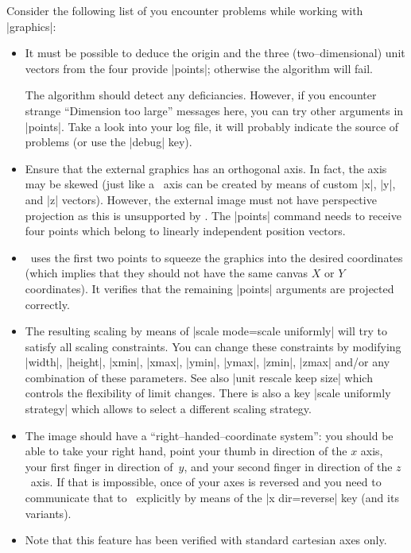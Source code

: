 {{\noindent
Consider the following list of you encounter problems while working with  |graphics|:
\begin{itemize}
	\item It must be possible to deduce the origin and the three (two--dimensional) unit vectors from the four provide |points|; otherwise the algorithm will fail. 
	
	The algorithm should detect any deficiancies. However, if you encounter strange ``Dimension too large'' messages here, you can try other arguments in |points|. Take a look into your log file, it will probably indicate the source of problems (or use the |debug| key).

	\item Ensure that the external graphics has an orthogonal axis. In fact, the axis may be skewed (just like a \PGFPlots\ axis can be created by means of custom |x|, |y|, and |z| vectors). However, the external image must not have perspective projection as this is unsupported by \PGFPlots. The |points| command needs to receive four points which belong to linearly independent position vectors. 

	\item \PGFPlots\ uses the first two points to squeeze the graphics into the desired coordinates (which implies that they should not have the same canvas $X$ or $Y$ coordinates). It verifies that the remaining |points| arguments are projected correctly.
	\item The resulting scaling by means of |scale mode=scale uniformly| will try to satisfy all scaling constraints. You can change these constraints by modifying |width|, |height|, |xmin|, |xmax|, |ymin|, |ymax|, |zmin|, |zmax| and/or any combination of these parameters. See also |unit rescale keep size| which controls the flexibility of limit changes. There is also a key |scale uniformly strategy| which allows to select a different scaling strategy.
	 
	\item The image should have a ``right--handed--coordinate system'': you should be able to take your right hand, point your thumb in direction of the $x$ axis, your first finger in direction of~$y$, and your second finger in direction of the $z$~axis. If that is impossible, once of your axes is reversed and you need to communicate that to \PGFPlots\ explicitly by means of the |x dir=reverse| key (and its variants).

	\item Note that this feature has been verified with standard cartesian axes only.


\end{itemize}}}
